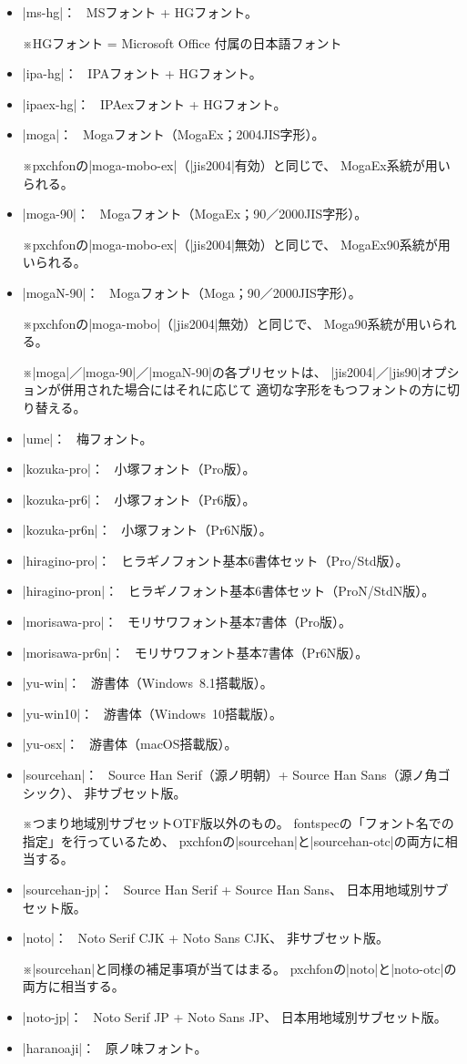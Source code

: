 \documentclass[xelatex,ja=standard,jafont=haranoaji,
  a4paper]{bxjsarticle}
\newcommand{\Pkg}[1]{\textsf{#1}}
\newcommand{\Note}{\par\noindent ※}
\newcommand{\Means}{：\ }
\newcommand{\JSl}{\mbox{／}\linebreak[0]}
\begin{document}
\begin{itemize}
\item |ms-hg|\Means
  MSフォント + HGフォント。
  \Note HGフォント = Microsoft Office 付属の日本語フォント
\item |ipa-hg|\Means
  IPAフォント + HGフォント。
\item |ipaex-hg|\Means
  IPAexフォント + HGフォント。
\item |moga|\Means
  Mogaフォント（MogaEx；2004JIS字形）。
  \Note \Pkg{pxchfon}の|moga-mobo-ex|（|jis2004|有効）と同じで、
  MogaEx系統が用いられる。
\item |moga-90|\Means
  Mogaフォント（MogaEx；90\JSl 2000JIS字形）。
  \Note \Pkg{pxchfon}の|moga-mobo-ex|（|jis2004|無効）と同じで、
  MogaEx90系統が用いられる。
\item |mogaN-90|\Means
  Mogaフォント（Moga；90\JSl 2000JIS字形）。
  \Note \Pkg{pxchfon}の|moga-mobo|（|jis2004|無効）と同じで、
  Moga90系統が用いられる。
  \Note |moga|\JSl|moga-90|\JSl|mogaN-90|の各プリセットは、%
  |jis2004|\JSl|jis90|オプションが併用された場合にはそれに応じて
  適切な字形をもつフォントの方に切り替える。
\item |ume|\Means
  梅フォント。
\item |kozuka-pro|\Means
  小塚フォント（Pro版）。
\item |kozuka-pr6|\Means
  小塚フォント（Pr6版）。
\item |kozuka-pr6n|\Means
  小塚フォント（Pr6N版）。
\item |hiragino-pro|\Means
  ヒラギノフォント基本6書体セット（Pro/Std版）。
\item |hiragino-pron|\Means
  ヒラギノフォント基本6書体セット（ProN/StdN版）。
\item |morisawa-pro|\Means
  モリサワフォント基本7書体（Pro版）。
\item |morisawa-pr6n|\Means
  モリサワフォント基本7書体（Pr6N版）。
\item |yu-win|\Means
  游書体（Windows~8.1搭載版）。
\item |yu-win10|\Means
  游書体（Windows~10搭載版）。%
\item |yu-osx|\Means
  游書体（macOS搭載版）。
\item |sourcehan|\Means
  Source Han Serif（源ノ明朝）+ Source Han Sans（源ノ角ゴシック）、
  非サブセット版。%
  \Note つまり地域別サブセットOTF版以外のもの。
  \Pkg{fontspec}の「フォント名での指定」を行っているため、%
  \Pkg{pxchfon}の|sourcehan|と|sourcehan-otc|の両方に相当する。
\item |sourcehan-jp|\Means
  Source Han Serif + Source Han Sans、
  日本用地域別サブセット版。
\item |noto|\Means
  Noto Serif CJK + Noto Sans CJK、
  非サブセット版。
  \Note |sourcehan|と同様の補足事項が当てはまる。
  \Pkg{pxchfon}の|noto|と|noto-otc|の両方に相当する。
\item |noto-jp|\Means
  Noto Serif JP + Noto Sans JP、
  日本用地域別サブセット版。
\item |haranoaji|\Means
  原ノ味フォント。
\end{itemize}
\end{document}
